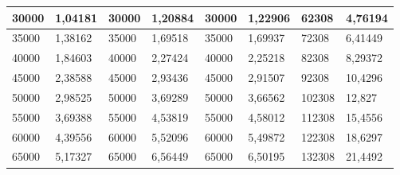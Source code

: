 \documentclass[11pt,openany]{book}
\begin{document}
\begin{table}[!ht]
\begin{tabular}{|l|l|l|l|l|l|l|l|}
        30000                                             & 1,04181                                            & 30000                                               & 1,20884                                             & 30000           & 1,22906         & 62308           & 4,76194         \\ \hline
        35000                                             & 1,38162                                            & 35000                                               & 1,69518                                             & 35000           & 1,69937         & 72308           & 6,41449         \\ \hline
        40000                                             & 1,84603                                            & 40000                                               & 2,27424                                             & 40000           & 2,25218         & 82308           & 8,29372         \\ \hline
        45000                                             & 2,38588                                            & 45000                                               & 2,93436                                             & 45000           & 2,91507         & 92308           & 10,4296         \\ \hline
        50000                                             & 2,98525                                            & 50000                                               & 3,69289                                             & 50000           & 3,66562         & 102308          & 12,827          \\ \hline
        55000                                             & 3,69388                                            & 55000                                               & 4,53819                                             & 55000           & 4,58012         & 112308          & 15,4556         \\ \hline
        60000                                             & 4,39556                                            & 60000                                               & 5,52096                                             & 60000           & 5,49872         & 122308          & 18,6297         \\ \hline
        65000                                             & 5,17327                                            & 65000                                               & 6,56449                                             & 65000           & 6,50195         & 132308          & 21,4492         \\ \hline

\end{tabular}
\end{table}
\end{document}
